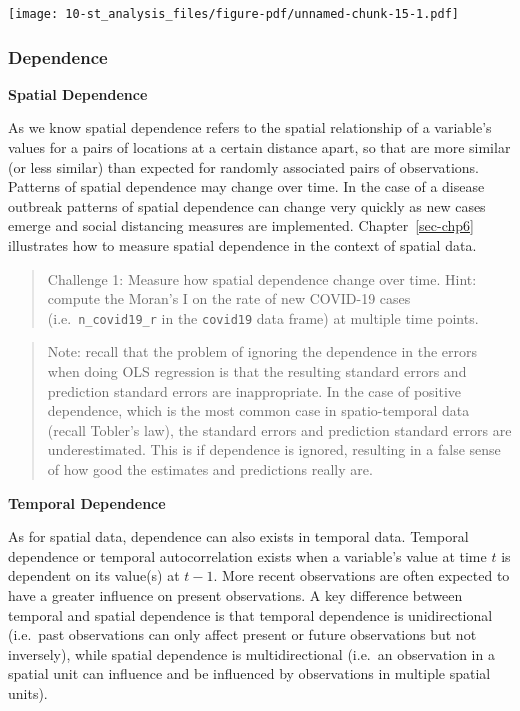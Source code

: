 \documentclass[
  letterpaper,
  DIV=11,
  numbers=noendperiod,
  oneside]{scrreprt}
\begin{document}
\texttt{[image: 10-st\_analysis\_files/figure-pdf/unnamed-chunk-15-1.pdf]}

\subsubsection{Dependence}\label{dependence}

\textbf{Spatial Dependence}

As we know spatial dependence refers to the spatial relationship of a
variable's values for a pairs of locations at a certain distance apart,
so that are more similar (or less similar) than expected for randomly
associated pairs of observations. Patterns of spatial dependence may
change over time. In the case of a disease outbreak patterns of spatial
dependence can change very quickly as new cases emerge and social
distancing measures are implemented. Chapter~\ref{sec-chp6} illustrates
how to measure spatial dependence in the context of spatial data.

\begin{quote}
Challenge 1: Measure how spatial dependence change over time. Hint:
compute the Moran's I on the rate of new COVID-19 cases
(i.e.~\texttt{n\_covid19\_r} in the \texttt{covid19} data frame) at
multiple time points.
\end{quote}

\begin{quote}
Note: recall that the problem of ignoring the dependence in the errors
when doing OLS regression is that the resulting standard errors and
prediction standard errors are inappropriate. In the case of positive
dependence, which is the most common case in spatio-temporal data
(recall Tobler's law), the standard errors and prediction standard
errors are underestimated. This is if dependence is ignored, resulting
in a false sense of how good the estimates and predictions really are.
\end{quote}

\textbf{Temporal Dependence}

As for spatial data, dependence can also exists in temporal data.
Temporal dependence or temporal autocorrelation exists when a variable's
value at time \(t\) is dependent on its value(s) at \(t-1\). More recent
observations are often expected to have a greater influence on present
observations. A key difference between temporal and spatial dependence
is that temporal dependence is unidirectional (i.e.~past observations
can only affect present or future observations but not inversely), while
spatial dependence is multidirectional (i.e.~an observation in a spatial
unit can influence and be influenced by observations in multiple spatial
units).
\end{document}
